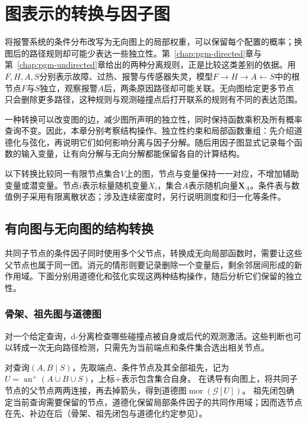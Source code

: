 \chapter{图表示的转换与因子图}
\label{chap:pgm-representations}

将报警系统的条件分布改写为无向图上的局部权重，可以保留每个配置的概率；换图后的路径规则却可能少表达一些独立性。第~\ref{chap:pgm-directed}章与第~\ref{chap:pgm-undirected}章给出的两种分离规则，正是比较这类差别的依据。用$F,H,A,S$分别表示故障、过热、报警与传感器失灵，模型$F\to H\to A\leftarrow S$中的根节点$F$与$S$独立，观察报警$A$后，两条原因路径却可能关联。无向图给定更多节点只会删除更多路径，这种规则与观测碰撞点后打开联系的规则有不同的表达范围。

一种转换可以改变图的边，减少图所声明的独立性，同时保持函数乘积及所有概率查询不变。因此，本章分别考察结构操作、独立性约束和局部函数重组：先介绍道德化与弦化，再说明它们如何影响分离与因子分解。随后用因子图显式记录每个函数的输入变量，让有向分解与无向分解都能保留各自的计算结构。

以下转换比较同一有限节点集合$V$上的图，节点与变量保持一一对应，不增加辅助变量或潜变量。节点$i$表示标量随机变量$X_i$，集合$A$表示随机向量$\bm{X}_A$。条件表与数值例子采用有限离散状态；涉及连续密度时，另行说明测度和归一化等条件。

\section{有向图与无向图的结构转换}
\label{sec:pgm-representations-structural-conversions}

共同子节点的条件因子同时使用多个父节点，转换成无向局部函数时，需要让这些父节点也属于同一团。消元的情形则要记录删除一个变量后，剩余邻居间形成的新作用域。下面分别用道德化和弦化实现这两种结构操作，随后分析它们保留的独立性。

\subsection{骨架、祖先图与道德图}
\label{sec:pgm-representations-ancestral-graphs}

对一个给定查询，d-分离检查哪些碰撞点被自身或后代的观测激活。这些判断也可以转成一次无向路径检测，只需先为当前端点和条件集合选出相关节点。

对查询$(A,B\mid S)$，先取端点、条件节点及其全部祖先，记为
$U=\operatorname{an}^{+}(A\cup B\cup S)$，上标$+$表示包含集合自身。
在诱导有向图上，将共同子节点的父节点两两连接，再去掉箭头，得到道德图$\operatorname{mor}(\mathcal G[U])$。
祖先闭包确定当前查询需要保留的节点，道德化保留局部条件因子的共同作用域；因而选节点在先、补边在后（骨架、祖先闭包与道德化约定参见）。

